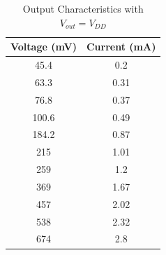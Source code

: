\documentclass[a4paper, 11pt]{article}
\begin{document}
\begin{table}[H]
\centering
\begin{tabular}{| c | c |}
\hline
\bf Voltage (mV) & \bf Current (mA)\\
\hline
45.4 & 0.2 \\63.3 & 0.31 \\76.8 & 0.37 \\100.6 & 0.49 \\184.2 & 0.87 \\215 & 1.01 \\259 & 1.2 \\369 & 1.67 \\457 & 2.02 \\538 & 2.32 \\674 & 2.8 \\
\hline
\end{tabular}
\caption{Output Characteristics with $V_{out} = V_{DD}$}
\end{table}
\end{document}
